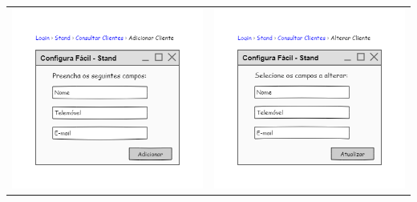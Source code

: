 \begin{center}
	\begin{table}[]
		\begin{tabular}{cc}
 			\includegraphics[width = 3in]{Prototipagem/adicionar_cliente.png}	& \includegraphics[width = 3in]{Prototipagem/alterar_cliente.png}
		\end{tabular}
	\end{table}
 	 	
\end{center}

